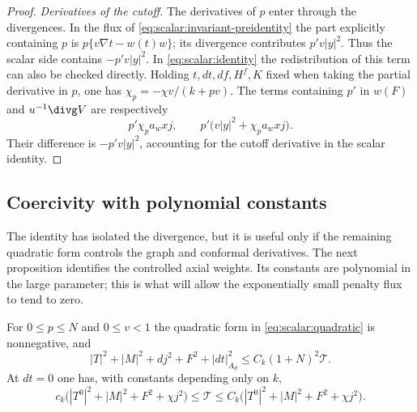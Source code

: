\begin{proof}
\emph{Derivatives of the cutoff.} The derivatives of $p$ enter
through the divergences.
In the flux of \eqref{eq:scalar:invariant-preidentity} the
part explicitly containing $p$ is
$p\{v\nabla t-w(t)w\}$; its divergence contributes
$p'v|y|^2$.  Thus the scalar side contains $-p'v|y|^2$.
In \eqref{eq:scalar:identity} the redistribution of this term
can also be checked directly.  Holding $t,dt,df,H^f,K$ fixed when taking
the partial derivative in $p$, one has
$\chi_p=-\chi v/(k+pv)$.  The terms containing $p'$ in $w(F)$ and
$u^{-1}\divg V$ are respectively
\[
 p'\chi_p a_wxj,
 \qquad p'\bigl(v|y|^2+\chi_p a_wxj\bigr).
\]
Their difference is $-p'v|y|^2$, accounting for the cutoff derivative
in the scalar identity.
\end{proof}

\subsection{Coercivity with polynomial constants}

The identity has isolated the divergence, but it is useful only if the
remaining quadratic form controls the graph and conformal derivatives.
The next proposition identifies the controlled axial weights.  Its
constants are polynomial in the large parameter; this is what will allow
the exponentially small penalty flux to tend to zero.


\begin{proposition}\label{prop:scalar:coercivity}
For $0\leq p\leq N$ and $0\leq v<1$ the quadratic form in
\eqref{eq:scalar:quadratic} is nonnegative, and
\begin{equation}
 |T|^2+|M|^2+d j^2+F^2+|dt|_{A_d}^2
                 \leq C_k(1+N)^2\mathcal T.
 \label{eq:scalar:coercivity}
\end{equation}
At $dt=0$ one has, with constants depending only on $k$,
\begin{equation}
 c_k\bigl(|T^0|^2+|M|^2+F^2+\chi j^2\bigr)
 \leq\mathcal T\leq
 C_k\bigl(|T^0|^2+|M|^2+F^2+\chi j^2\bigr).
 \label{eq:scalar:stationary-coercivity}
\end{equation}
\end{proposition}

